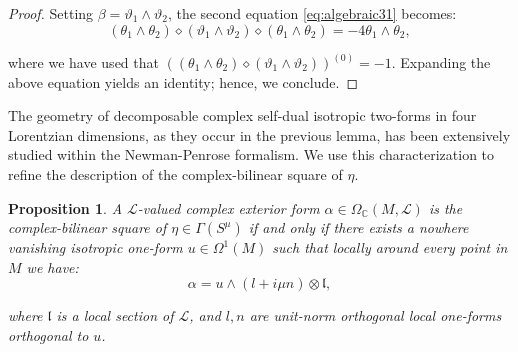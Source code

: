 \documentclass[10pt,a4paper,twoside,reqno]{amsart}
\theoremstyle{plain}
\newtheorem{prop}[thm]{Proposition}
\theoremstyle{definition}
\theoremstyle{remark}
\def\C{\mathbb{C}}
\def\cL{\mathcal{L}}
\begin{document}
\begin{proof}
Setting $\beta = \vartheta_1\wedge\vartheta_2$, the second equation \eqref{eq:algebraic31} becomes:
\begin{equation*}
(\theta_1\wedge\theta_2)\diamond(\vartheta_1\wedge\vartheta_2)\diamond(\theta_1\wedge\theta_2)=-4\theta_1\wedge\theta_2,
\end{equation*}

\noindent
where we have used that $((\theta_1\wedge\theta_2)\diamond(\vartheta_1\wedge\vartheta_2))^{(0)}=-1$. Expanding the above equation yields an identity; hence, we conclude.
\end{proof}

\noindent
The geometry of decomposable complex self-dual isotropic two-forms in four Lorentzian dimensions, as they occur in the previous lemma, has been extensively studied within the Newman-Penrose formalism. We use this characterization to refine the description of the complex-bilinear square of $\eta$.

\begin{prop}
A $\cL$-valued complex exterior form $\alpha \in \Omega_\C(M,\cL)$ is the complex-bilinear square of $\eta\in\Gamma(S^\mu)$ if and only if there exists a nowhere vanishing isotropic one-form $u\in \Omega^1(M)$ such that locally around every point in $M$ we have:
\begin{equation*}
\alpha =  u\wedge(l+i\mu n)\otimes \mathfrak{l},
\end{equation*} 

\noindent
where $\mathfrak{l}$ is a local section of $\cL$, and $l, n$ are unit-norm orthogonal local one-forms orthogonal to $u$.    
\end{prop}
\end{document}
